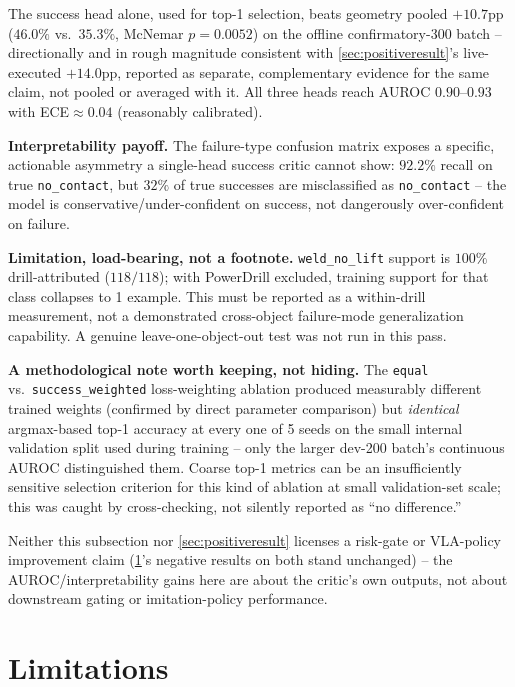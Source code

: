 \documentclass[journal]{IEEEtran}
\begin{document}
The success head alone, used for top-1 selection, beats geometry pooled
$+10.7$pp ($46.0\%$ vs.\ $35.3\%$, McNemar $p{=}0.0052$) on the offline
confirmatory-300 batch -- directionally and in rough magnitude consistent
with \cref{sec:positiveresult}'s live-executed $+14.0$pp, reported as
separate, complementary evidence for the same claim, not pooled or
averaged with it. All three heads reach AUROC $0.90$--$0.93$ with
ECE$\approx 0.04$ (reasonably calibrated).

\textbf{Interpretability payoff.} The failure-type confusion matrix exposes
a specific, actionable asymmetry a single-head success critic cannot show:
$92.2\%$ recall on true \texttt{no\_contact}, but $32\%$ of true successes
are misclassified as \texttt{no\_contact} -- the model is
conservative/under-confident on success, not dangerously over-confident on
failure.

\textbf{Limitation, load-bearing, not a footnote.} \texttt{weld\_no\_lift}
support is $100\%$ drill-attributed ($118/118$); with PowerDrill excluded,
training support for that class collapses to 1 example. This must be
reported as a within-drill measurement, not a demonstrated cross-object
failure-mode generalization capability. A genuine leave-one-object-out test
was not run in this pass.

\textbf{A methodological note worth keeping, not hiding.} The
\texttt{equal} vs.\ \texttt{success\_weighted} loss-weighting ablation
produced measurably different trained weights (confirmed by direct
parameter comparison) but \emph{identical} argmax-based top-1 accuracy at
every one of 5 seeds on the small internal validation split used during
training -- only the larger dev-200 batch's continuous AUROC distinguished
them. Coarse top-1 metrics can be an insufficiently sensitive selection
criterion for this kind of ablation at small validation-set scale; this was
caught by cross-checking, not silently reported as ``no difference.''

Neither this subsection nor \cref{sec:positiveresult} licenses a risk-gate
or VLA-policy improvement claim (\cref{sec:limitations}'s negative results
on both stand unchanged) -- the AUROC/interpretability gains here are
about the critic's own outputs, not about downstream gating or
imitation-policy performance.

\section{Limitations}
\label{sec:limitations}
\end{document}
